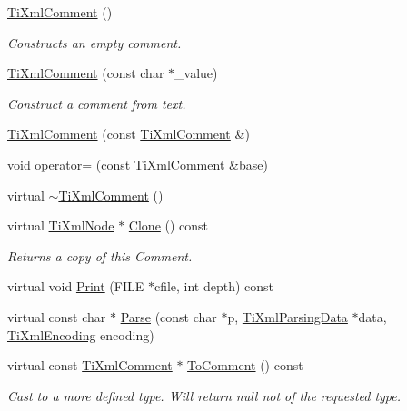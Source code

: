 \begin{DoxyCompactItemize}
\item 
\hyperlink{class_ti_xml_comment_aaa3252031d3e8bd3a2bf51a1c61201b7}{Ti\-Xml\-Comment} ()
\begin{DoxyCompactList}\small\item\em Constructs an empty comment. \end{DoxyCompactList}\item 
\hyperlink{class_ti_xml_comment_a37e7802ef17bc03ebe5ae79bf0713d47}{Ti\-Xml\-Comment} (const char $\ast$\-\_\-value)
\begin{DoxyCompactList}\small\item\em Construct a comment from text. \end{DoxyCompactList}\item 
\hyperlink{class_ti_xml_comment_afaec41ac2760ce946ba1590eb5708e50}{Ti\-Xml\-Comment} (const \hyperlink{class_ti_xml_comment}{Ti\-Xml\-Comment} \&)
\item 
void \hyperlink{class_ti_xml_comment_a46373f99b65cb960637dccb1f126bd49}{operator=} (const \hyperlink{class_ti_xml_comment}{Ti\-Xml\-Comment} \&base)
\item 
virtual \hyperlink{class_ti_xml_comment_a3264ae2e9c4a127edfa03289bb2c9aa2}{$\sim$\-Ti\-Xml\-Comment} ()
\item 
virtual \hyperlink{class_ti_xml_node}{Ti\-Xml\-Node} $\ast$ \hyperlink{class_ti_xml_comment_a4f6590c9c9a2b63a48972655b78eb853}{Clone} () const 
\begin{DoxyCompactList}\small\item\em Returns a copy of this Comment. \end{DoxyCompactList}\item 
virtual void \hyperlink{class_ti_xml_comment_a17398061d62c470f57801ce28fa33ad4}{Print} (F\-I\-L\-E $\ast$cfile, int depth) const 
\item 
virtual const char $\ast$ \hyperlink{class_ti_xml_comment_a43bddc18ac057734b41d84653b71d3e0}{Parse} (const char $\ast$p, \hyperlink{class_ti_xml_parsing_data}{Ti\-Xml\-Parsing\-Data} $\ast$data, \hyperlink{tinyxml_8h_a88d51847a13ee0f4b4d320d03d2c4d96}{Ti\-Xml\-Encoding} encoding)
\item 
virtual const \hyperlink{class_ti_xml_comment}{Ti\-Xml\-Comment} $\ast$ \hyperlink{class_ti_xml_comment_a00fb4215c20a2399ea05ac9b9e7e68a0}{To\-Comment} () const 
\begin{DoxyCompactList}\small\item\em Cast to a more defined type. Will return null not of the requested type. \end{DoxyCompactList}\item 

\end{DoxyCompactItemize}
